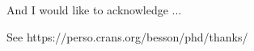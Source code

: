 
\begin{acknowledgements}


And I would like to acknowledge ...

See https://perso.crans.org/besson/phd/thanks/


\end{acknowledgements}
